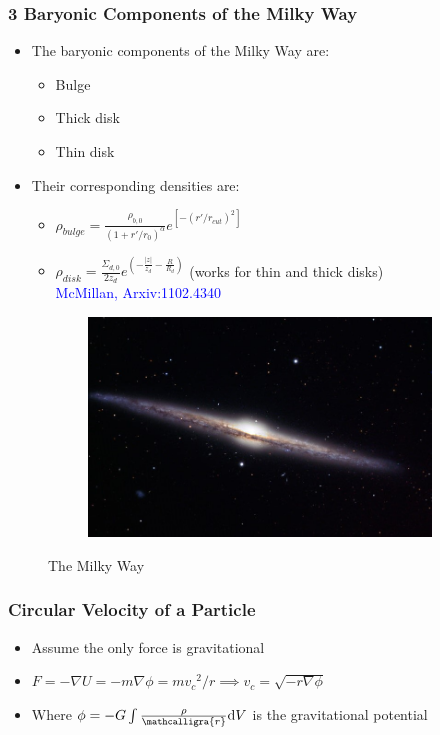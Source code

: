 \documentclass{beamer}
\newcommand{\scripty}[1]{\ensuremath{\mathcalligra{#1}}}
\begin{document}
\begin{frame}
\frametitle{3 Baryonic Components of the Milky Way}
\begin{itemize}
\item The baryonic components of the Milky Way are:
\begin{itemize}
\item Bulge 
\item Thick disk  
\item Thin disk
\end{itemize}
\item Their corresponding densities are:
\begin{itemize}
\item  $\rho_{bulge}=\frac{\rho_{b,0}}{(1+r'/r_0)^\alpha} e^{[-(r'/r_{cut})^2]}$
\item $\rho_{disk}=\frac{\Sigma_{d,0}}{2 z_d} e^{(-\frac{|z|}{z_d}-\frac{R}{R_d})}$ (works for thin and thick disks)\\
\hspace*{\fill} \textcolor{blue} {McMillan, Arxiv:1102.4340}
\end{itemize}
\end{itemize}

\begin{figure}[h!]
  \centering
  \begin{subfigure}[b]{0.4\linewidth}
    \includegraphics[width=\linewidth]{milkyWay}
  \end{subfigure}
    \caption{The Milky Way}
\end{figure}
\end{frame}

\begin{frame}
\frametitle{Circular Velocity of a Particle}
\begin{itemize}
\item Assume the only force is gravitational
\item $F=-\nabla U=-m \nabla \phi=m {v_c}^2/r \implies v_c=\sqrt{-r \nabla \phi}$
\item Where $\phi=-G \int \frac{\rho}{\scripty{r}} \mathrm{d} V$ is the gravitational potential

\end{itemize}
\end{frame}
\end{document}
